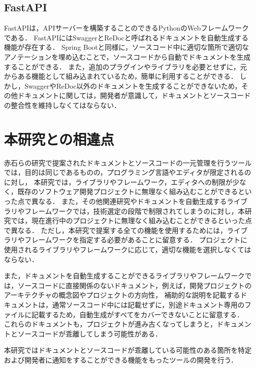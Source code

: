 \subsection{FastAPI}
FastAPI\cite{fastapi}は，APIサーバーを構築することのできるPythonのWebフレームワークである．
FastAPIにはSwaggerとReDoc\cite{redoc}と呼ばれるドキュメントを自動生成する機能が存在する．
Spring Bootと同様に，ソースコード中に適切な箇所で適切なアノテーションを埋め込むことで，ソースコードから自動でドキュメントを生成することができる．
また，追加のプラグインやライブラリを必要とせずに，元からある機能として組み込まれているため，簡単に利用することができる．
しかし，SwaggerやReDoc以外のドキュメントを生成することができないため，その他ドキュメントに関しては，開発者が意識して，ドキュメントとソースコードの整合性を維持しなくてはならない．

\section{本研究との相違点}
赤石らの研究で提案されたドキュメントとソースコードの一元管理を行うツールでは，目的は同じであるものの，プログラミング言語やエディタが限定されるのに対し，
本研究では，ライブラリやフレームワーク，エディタへの制限が少なく，既存のソフトウェア開発プロジェクトに無理なく組み込むことができるといった点で異なる．
また，その他関連研究やドキュメントを自動生成するライブラリやフレームワークでは，技術選定の段階で制限されてしまうのに対し，本研究では，現在進行中のプロジェクトに無理なく組み込むことができるといった点で異なる．
ただし，本研究で提案する全ての機能を使用するためには，ライブラリやフレームワークを指定する必要があることに留意する．
プロジェクトに使用されるライブラリやフレームワークに応じて，適切な機能を選択しなくてはならない．

また，ドキュメントを自動生成することができるライブラリやフレームワークでは，ソースコードに直接関係のないドキュメント，例えば，開発プロジェクトのアーキテクチャの概念図やプロジェクトの方向性，
補助的な説明を記載するドキュメントは，通常ソースコード中には記載せずに，別途ドキュメント専用のファイルに記載するため，自動生成がすべてをカバーできないことに留意する．
これらのドキュメントも，プロジェクトが進み古くなってしまうと，ドキュメントとソースコードが乖離してしまう可能性がある．

本研究ではドキュメントとソースコードが乖離している可能性のある箇所を特定および開発者に通知をすることができる機能をもったツールの開発を行う．
